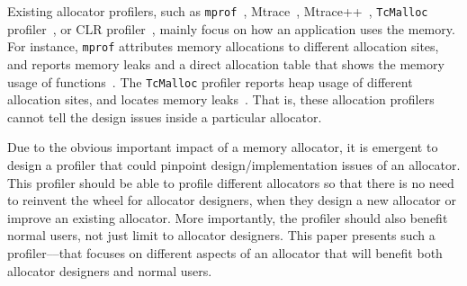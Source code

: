 
Existing allocator profilers, such as \texttt{mprof}~\cite{Zorn:1988:MAP:894814}, Mtrace~\cite{mtrace}, Mtrace++~\cite{Lee:2000:DMM:786772.787150}, \texttt{TcMalloc} profiler~\cite{tcmalloc-profiler}, or CLR profiler~\cite{lupasc2014dynamic}, mainly focus on how an application uses the memory. For instance, \texttt{mprof} attributes memory allocations to different allocation sites, and reports memory leaks and a direct allocation table that shows the memory usage of functions~\cite{Zorn:1988:MAP:894814}. The \texttt{TcMalloc} profiler reports heap usage of different allocation sites, and locates memory leaks~\cite{tcmalloc-profiler}. That is, these allocation profilers cannot tell the design issues inside a particular allocator. 

Due to the obvious important impact of a memory allocator, it is emergent to design a profiler that could pinpoint design/implementation issues of an allocator. This profiler should be able to profile different allocators so that there is no need to reinvent the wheel for allocator designers, when they design a new allocator or improve an existing allocator. More importantly, the profiler should also benefit normal users, not just limit to allocator designers. This paper presents such a profiler--\MP{}--that focuses on different aspects of an allocator that will benefit both allocator designers and normal users. 

